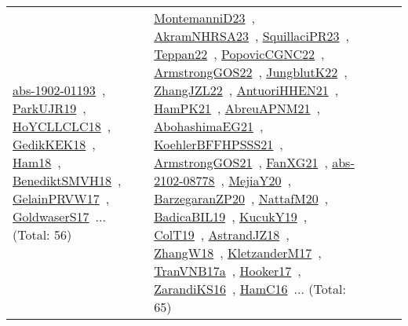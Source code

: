 {\begin{longtable}{lp{3cm}>{\raggedright\arraybackslash}p{6cm}>{\raggedright\arraybackslash}p{6cm}>{\raggedright\arraybackslash}p{8cm}}
\href{works/abs-1902-01193.pdf}{abs-1902-01193}~\cite{abs-1902-01193}, \href{works/ParkUJR19.pdf}{ParkUJR19}~\cite{ParkUJR19}, \href{works/HoYCLLCLC18.pdf}{HoYCLLCLC18}~\cite{HoYCLLCLC18}, \href{works/GedikKEK18.pdf}{GedikKEK18}~\cite{GedikKEK18}, \href{works/Ham18.pdf}{Ham18}~\cite{Ham18}, \href{works/BenediktSMVH18.pdf}{BenediktSMVH18}~\cite{BenediktSMVH18}, \href{works/GelainPRVW17.pdf}{GelainPRVW17}~\cite{GelainPRVW17}, \href{works/GoldwaserS17.pdf}{GoldwaserS17}~\cite{GoldwaserS17}... (Total: 56) & \href{works/MontemanniD23.pdf}{MontemanniD23}~\cite{MontemanniD23}, \href{works/AkramNHRSA23.pdf}{AkramNHRSA23}~\cite{AkramNHRSA23}, \href{works/SquillaciPR23.pdf}{SquillaciPR23}~\cite{SquillaciPR23}, \href{works/Teppan22.pdf}{Teppan22}~\cite{Teppan22}, \href{works/PopovicCGNC22.pdf}{PopovicCGNC22}~\cite{PopovicCGNC22}, \href{works/ArmstrongGOS22.pdf}{ArmstrongGOS22}~\cite{ArmstrongGOS22}, \href{works/JungblutK22.pdf}{JungblutK22}~\cite{JungblutK22}, \href{works/ZhangJZL22.pdf}{ZhangJZL22}~\cite{ZhangJZL22}, \href{works/AntuoriHHEN21.pdf}{AntuoriHHEN21}~\cite{AntuoriHHEN21}, \href{works/HamPK21.pdf}{HamPK21}~\cite{HamPK21}, \href{works/AbreuAPNM21.pdf}{AbreuAPNM21}~\cite{AbreuAPNM21}, \href{works/AbohashimaEG21.pdf}{AbohashimaEG21}~\cite{AbohashimaEG21}, \href{works/KoehlerBFFHPSSS21.pdf}{KoehlerBFFHPSSS21}~\cite{KoehlerBFFHPSSS21}, \href{works/ArmstrongGOS21.pdf}{ArmstrongGOS21}~\cite{ArmstrongGOS21}, \href{works/FanXG21.pdf}{FanXG21}~\cite{FanXG21}, \href{works/abs-2102-08778.pdf}{abs-2102-08778}~\cite{abs-2102-08778}, \href{works/MejiaY20.pdf}{MejiaY20}~\cite{MejiaY20}, \href{works/BarzegaranZP20.pdf}{BarzegaranZP20}~\cite{BarzegaranZP20}, \href{works/NattafM20.pdf}{NattafM20}~\cite{NattafM20}, \href{works/BadicaBIL19.pdf}{BadicaBIL19}~\cite{BadicaBIL19}, \href{works/KucukY19.pdf}{KucukY19}~\cite{KucukY19}, \href{works/ColT19.pdf}{ColT19}~\cite{ColT19}, \href{works/AstrandJZ18.pdf}{AstrandJZ18}~\cite{AstrandJZ18}, \href{works/ZhangW18.pdf}{ZhangW18}~\cite{ZhangW18}, \href{works/KletzanderM17.pdf}{KletzanderM17}~\cite{KletzanderM17}, \href{works/TranVNB17a.pdf}{TranVNB17a}~\cite{TranVNB17a}, \href{works/Hooker17.pdf}{Hooker17}~\cite{Hooker17}, \href{works/ZarandiKS16.pdf}{ZarandiKS16}~\cite{ZarandiKS16}, \href{works/HamC16.pdf}{HamC16}~\cite{HamC16}... (Total: 65)\\

\end{longtable}}
